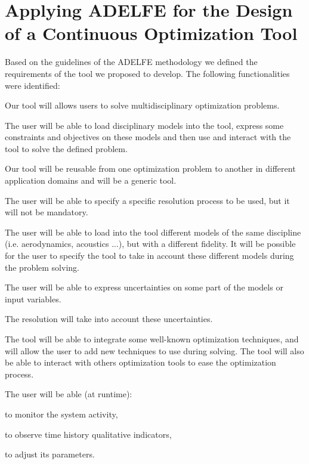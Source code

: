 \section{Applying ADELFE for the Design of a Continuous Optimization Tool}

Based on the guidelines of the ADELFE methodology we defined the requirements of the tool we proposed to develop. The following functionalities were identified:
\begin{compactitem}
\item Our tool will allows users to solve multidisciplinary optimization problems.
\item  The user will be able to load disciplinary models into the tool, express some constraints and objectives on these models and then use and interact with the tool to solve the defined problem.
\item Our tool will be reusable from one optimization problem to another in different application domains and will be a generic tool.
\item The user will be able to specify a specific resolution process to be used, but it will not be mandatory.
\item The user will be able to load into the tool different models of the same discipline (i.e. aerodynamics, acoustics ...), but with a different fidelity. It will be possible for the user to specify the tool to take in account these different models during the problem solving.
\item The user will be able to express uncertainties on some part of the models or input variables.
\item The resolution will take into account these uncertainties.
\item The tool will be able to integrate some well-known optimization techniques, and will allow the user to add new techniques to use during solving. The tool will also be able to interact with others optimization tools to ease the optimization process.

\item The user will be able (at runtime):
	\begin{compactitem}
    \item to monitor the system activity,
    \item to observe time history qualitative indicators,
    \item to adjust its parameters.
    \end{compactitem}
\end{compactitem}


